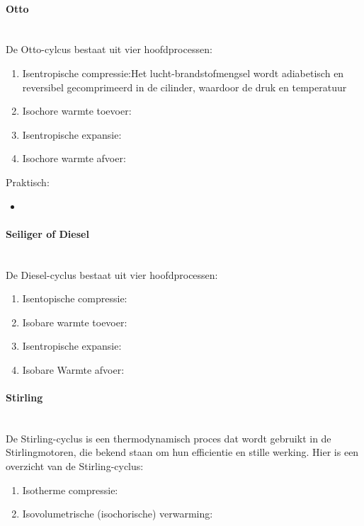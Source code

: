 \documentclass[12pt]{article}
\newcommand{\myparagraph}[1]{\paragraph{#1}\mbox{}\\}
\begin{document}
\myparagraph{Otto}
De Otto-cylcus bestaat uit vier hoofdprocessen:
\begin{enumerate}
    \item Isentropische compressie:Het lucht-brandstofmengsel wordt adiabetisch en reversibel gecomprimeerd in de cilinder, waardoor de druk en temperatuur
    \item Isochore warmte toevoer:
    \item Isentropische expansie:
    \item Isochore warmte afvoer:
\end{enumerate}
Praktisch:\begin{itemize}
    \item 
\end{itemize}
\myparagraph{Seiliger of Diesel}
De Diesel-cyclus bestaat uit vier hoofdprocessen:
\begin{enumerate}
    \item Isentopische compressie:
    \item Isobare warmte toevoer:
    \item Isentropische expansie:
    \item Isobare Warmte afvoer:
\end{enumerate}
\myparagraph{Stirling}
De Stirling-cyclus is een thermodynamisch proces dat wordt gebruikt in de Stirlingmotoren, die bekend staan om hun efficientie en stille werking. Hier is een overzicht van de Stirling-cyclus:
\begin{enumerate}
    \item Isotherme compressie:
    \item Isovolumetrische (isochorische) verwarming:
\end{enumerate}
\end{document}
